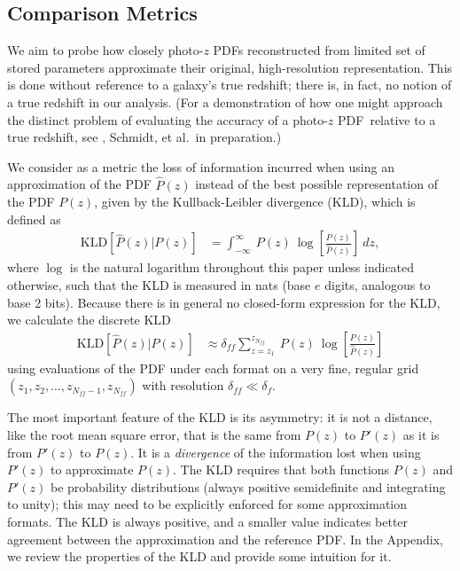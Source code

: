 \documentclass[\docopts]{\docclass}
\newcommand{\pz}{photo-$z$ PDF}
\begin{document}
\subsection{Comparison Metrics}
\label{sec:metric}

We aim to probe how closely \pz s reconstructed from limited set of stored 
parameters approximate their original, high-resolution representation.
This is done without reference to a galaxy's true redshift; there is, in fact, 
no notion of a true redshift in our analysis.
(For a demonstration of how one might approach the distinct problem of 
evaluating the accuracy of a \pz\ relative to a true redshift, see 
\citet{polsterer_uncertain_2016}, Schmidt, et al.\ in preparation.)

We consider as a metric the loss of information incurred when using an 
approximation of the PDF $\hat{P}(z)$ instead of the best possible 
representation of the  PDF $P(z)$, given by the Kullback-Leibler divergence 
(KLD), which is defined as
\begin{align}
  \label{eq:kld}
  \mathrm{KLD}[\hat{P}(z) | P(z)] &= \int_{-\infty}^{\infty}\ P(z)\ 
\log\left[\frac{P(z)}{\hat{P}(z)}\right]\ dz,
\end{align}
where $\log$ is the natural logarithm throughout this paper unless indicated 
otherwise, such that the KLD is measured in nats (base $e$ digits, analogous to 
base 2 bits).
Because there is in general no closed-form expression for the KLD, we calculate 
the discrete KLD
\begin{align}
  \label{eq:kld_approx}
  \mathrm{KLD}[\hat{P}(z) | P(z)] &\approx 
\delta_{ff}\sum_{z=z_{1}}^{z_{N_{ff}}}\ P(z)\ 
\log\left[\frac{P(z)}{\hat{P}(z)}\right]
\end{align}
using evaluations of the PDF under each format on a very fine, regular grid 
$(z_{1}, z_{2}, \dots, z_{N_{ff}-1}, z_{N_{ff}})$ with resolution $\delta_{ff} 
\ll \delta_{f}$.

The most important feature of the KLD is its asymmetry: it is not a distance, 
like the root mean square error, that is the same from $P(z)$ to $P'(z)$ as it 
is from $P'(z)$ to $P(z)$.
It is a \textit{divergence} of the information lost when using $P'(z)$ to 
approximate $P(z)$.
The KLD requires that both functions $P(z)$ and $P'(z)$ be probability 
distributions (always positive semidefinite and integrating to unity); this may 
need to be explicitly enforced for some approximation formats.
The KLD is always positive, and a smaller value indicates better agreement 
between the approximation and the reference PDF.
In the Appendix, we review the properties of the KLD and provide some intuition 
for it.
\end{document}
